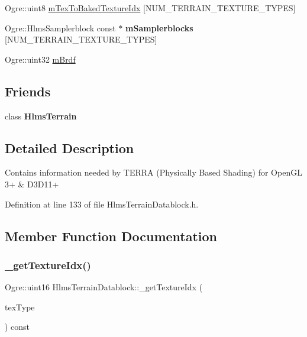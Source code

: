 \begin{DoxyCompactItemize}
Ogre\+::uint8 \hyperlink{class_hlms_terrain_datablock_acb2652e4731f6cf65b232393531b1d11}{m\+Tex\+To\+Baked\+Texture\+Idx} \mbox{[}N\+U\+M\+\_\+\+T\+E\+R\+R\+A\+I\+N\+\_\+\+T\+E\+X\+T\+U\+R\+E\+\_\+\+T\+Y\+P\+ES\mbox{]}
\item 
\mbox{\label{class_hlms_terrain_datablock_a7ea68e0c344afb54fa5963f9227a768f}} 
Ogre\+::\+Hlms\+Samplerblock const  $\ast$ {\bfseries m\+Samplerblocks} \mbox{[}N\+U\+M\+\_\+\+T\+E\+R\+R\+A\+I\+N\+\_\+\+T\+E\+X\+T\+U\+R\+E\+\_\+\+T\+Y\+P\+ES\mbox{]}
\item 
Ogre\+::uint32 \hyperlink{class_hlms_terrain_datablock_aec0c1743fab32d302e794a1149139443}{m\+Brdf}
\end{DoxyCompactItemize}
\subsection*{Friends}
\begin{DoxyCompactItemize}
\item 
\mbox{\label{class_hlms_terrain_datablock_aa6bf7069e8c5d0a65a557474ec8dff5d}} 
class {\bfseries Hlms\+Terrain}
\end{DoxyCompactItemize}


\subsection{Detailed Description}
Contains information needed by T\+E\+R\+RA (Physically Based Shading) for Open\+GL 3+ \& D3\+D11+ 

Definition at line 133 of file Hlms\+Terrain\+Datablock.\+h.



\subsection{Member Function Documentation}
\mbox{\label{class_hlms_terrain_datablock_af9f5260f2d4238492c9ef2d78e1bc0cb}} 
\subsubsection{\texorpdfstring{\+\_\+get\+Texture\+Idx()}{\_getTextureIdx()}}
{\footnotesize\ttfamily Ogre\+::uint16 Hlms\+Terrain\+Datablock\+::\+\_\+get\+Texture\+Idx (\begin{DoxyParamCaption}\item[{Terrain\+Texture\+Types}]{tex\+Type }\end{DoxyParamCaption}) const\hspace{0.3cm}{\ttfamily [inline]}}

